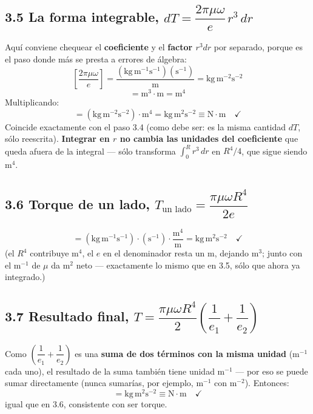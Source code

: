\documentclass[11pt]{article}
\begin{document}
\subsection*{3.5 La forma integrable, $dT=\dfrac{2\pi\mu\omega}{e}\,r^3\,dr$}
Aqu\'i conviene chequear el \textbf{coeficiente} y el \textbf{factor $r^3dr$} por
separado, porque es el paso donde m\'as se presta a errores de \'algebra:
\begin{equation}
\left[\frac{2\pi\mu\omega}{e}\right]
= \frac{\left(\text{kg}\,\text{m}^{-1}\text{s}^{-1}\right)\left(\text{s}^{-1}\right)}
{\text{m}}
= \text{kg}\,\text{m}^{-2}\text{s}^{-2}
\end{equation}
\begin{equation}
[r^3\,dr] = \text{m}^3\cdot\text{m} = \text{m}^4
\end{equation}
Multiplicando:
\begin{equation}
[dT] = \left(\text{kg}\,\text{m}^{-2}\text{s}^{-2}\right)\cdot\text{m}^4
= \text{kg}\,\text{m}^2\text{s}^{-2} \equiv \text{N}\cdot\text{m}\quad\checkmark
\end{equation}
Coincide exactamente con el paso 3.4 (como debe ser: es la misma cantidad $dT$,
s\'olo reescrita). \textbf{Integrar en $r$ no cambia las unidades del coeficiente}
que queda afuera de la integral --- s\'olo transforma $\int_0^R r^3\,dr$ en
$R^4/4$, que sigue siendo m$^4$.

\subsection*{3.6 Torque de un lado, $T_{\text{un lado}}=\dfrac{\pi\mu\omega R^4}{2e}$}
\begin{equation}
[T_{\text{un lado}}]
= \left(\text{kg}\,\text{m}^{-1}\text{s}^{-1}\right)\cdot\left(\text{s}^{-1}\right)
\cdot\frac{\text{m}^4}{\text{m}}
= \text{kg}\,\text{m}^2\text{s}^{-2}\quad\checkmark
\end{equation}
(el $R^4$ contribuye m$^4$, el $e$ en el denominador resta un m, dejando m$^3$; junto
con el m$^{-1}$ de $\mu$ da m$^2$ neto --- exactamente lo mismo que en 3.5, s\'olo que
ahora ya integrado.)

\subsection*{3.7 Resultado final, $T=\dfrac{\pi\mu\omega R^4}{2}\!\left(\dfrac1{e_1}+
\dfrac1{e_2}\right)$}
Como $\left(\dfrac1{e_1}+\dfrac1{e_2}\right)$ es una \textbf{suma de dos t\'erminos
con la misma unidad} (m$^{-1}$ cada uno), el resultado de la suma tambi\'en tiene
unidad m$^{-1}$ --- por eso se puede sumar directamente (nunca sumar\'ias, por
ejemplo, m$^{-1}$ con m$^{-2}$). Entonces:
\begin{equation}
[T] = \text{kg}\,\text{m}^2\text{s}^{-2} \equiv \text{N}\cdot\text{m}\quad\checkmark
\end{equation}
igual que en 3.6, consistente con ser torque.
\end{document}
